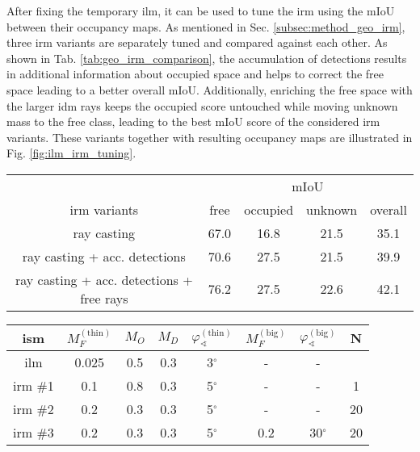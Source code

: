 After fixing the temporary \gls{ilm}, it can be used to tune the \gls{irm} using the mIoU between their occupancy maps. As mentioned in Sec. \ref{subsec:method_geo_irm}, three \gls{irm} variants are separately tuned and compared against each other. 
As shown in Tab. \ref{tab:geo_irm_comparison}, the accumulation of detections results in additional information about occupied space and helps to correct the free space leading to a better overall mIoU. Additionally, enriching the free space with the larger \gls{idm} rays keeps the occupied score untouched while moving unknown mass to the free class, leading to the best mIoU score of the considered \gls{irm} variants. These variants together with resulting occupancy maps are illustrated in Fig. \ref{fig:ilm_irm_tuning}.
\begin{center}
	\begin{tabular}{c|ccc|c}
		& \multicolumn{4}{c}{mIoU}\\
		\gls{irm} variants & free & occupied & unknown & overall \\
		\hline
		ray casting & 67.0 & 16.8 & 21.5 & 35.1\\
		ray casting + acc. detections & 70.6 & 27.5 & 21.5 & 39.9\\
		ray casting + acc. detections + free rays & 76.2 & 27.5 & 22.6 & 42.1\\		
	\end{tabular}
\end{center}
\begin{center}
	\begin{tabular}{c|c|c|c|c|c|c|c}
		\gls{ism} & $M_F^{(\text{thin})}$ & $M_O$ & $M_D$ & $\varphi_\sphericalangle^{(\text{thin})}$ & $M_F^{(\text{big})}$ & $\varphi_\sphericalangle^{(\text{big})}$ & N\\
		\hline
		\gls{ilm} & 0.025 & 0.5 & 0.3 & 3$^\circ$ & - & - \\
		\gls{irm} \#1 & 0.1 & 0.8 & 0.3 & 5$^\circ$ & - & - & 1\\
		\gls{irm} \#2& 0.2 & 0.3 & 0.3 & 5$^\circ$ & - & - & 20\\
		\gls{irm} \#3& 0.2 & 0.3 & 0.3 & 5$^\circ$ & 0.2 & 30$^\circ$ & 20 
	\end{tabular}
\end{center}
%
